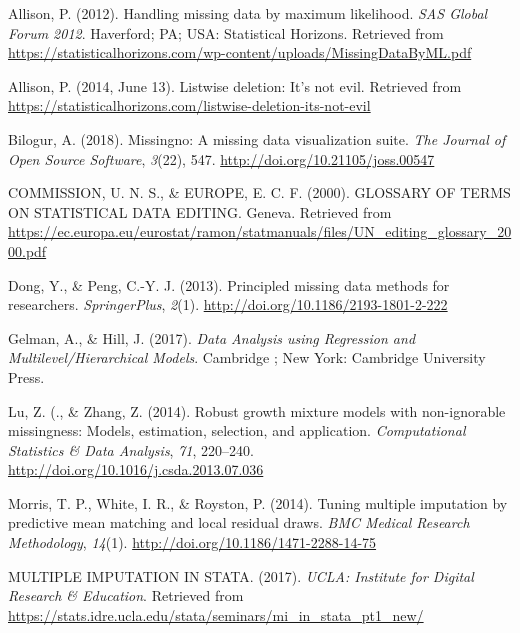 \documentclass[12pt,oneside]{chicagocapstone}
\begin{document}
\setlength{\parindent}{-0.20in} \setlength{\leftskip}{0.20in}
\setlength{\parskip}{8pt}

\hypertarget{refs}{}
\hypertarget{ref-allison_handling_2012}{}
Allison, P. (2012). Handling missing data by maximum likelihood.
\emph{SAS Global Forum 2012}. Haverford; PA; USA: Statistical Horizons.
Retrieved from
\url{https://statisticalhorizons.com/wp-content/uploads/MissingDataByML.pdf}

\hypertarget{ref-allison_handling_2014}{}
Allison, P. (2014, June 13). Listwise deletion: It's not evil. Retrieved
from
\url{https://statisticalhorizons.com/listwise-deletion-its-not-evil}

\hypertarget{ref-bilogur_missingno_2018}{}
Bilogur, A. (2018). Missingno: A missing data visualization suite.
\emph{The Journal of Open Source Software}, \emph{3}(22), 547.
\url{http://doi.org/10.21105/joss.00547}

\hypertarget{ref-econ_commission}{}
COMMISSION, U. N. S., \& EUROPE, E. C. F. (2000). GLOSSARY OF TERMS ON
STATISTICAL DATA EDITING. Geneva. Retrieved from
\url{https://ec.europa.eu/eurostat/ramon/statmanuals/files/UN_editing_glossary_2000.pdf}

\hypertarget{ref-peng_dong}{}
Dong, Y., \& Peng, C.-Y. J. (2013). Principled missing data methods for
researchers. \emph{SpringerPlus}, \emph{2}(1).
\url{http://doi.org/10.1186/2193-1801-2-222}

\hypertarget{ref-gelman_data_2017}{}
Gelman, A., \& Hill, J. (2017). \emph{Data Analysis using Regression and
Multilevel/Hierarchical Models}. Cambridge ; New York: Cambridge
University Press.

\hypertarget{ref-lu_robust_2014}{}
Lu, Z. (., \& Zhang, Z. (2014). Robust growth mixture models with
non-ignorable missingness: Models, estimation, selection, and
application. \emph{Computational Statistics \& Data Analysis},
\emph{71}, 220--240. \url{http://doi.org/10.1016/j.csda.2013.07.036}

\hypertarget{ref-morris_tuning_2014}{}
Morris, T. P., White, I. R., \& Royston, P. (2014). Tuning multiple
imputation by predictive mean matching and local residual draws.
\emph{BMC Medical Research Methodology}, \emph{14}(1).
\url{http://doi.org/10.1186/1471-2288-14-75}

\hypertarget{ref-introduction_to_sas_notitle_2017}{}
MULTIPLE IMPUTATION IN STATA. (2017). \emph{UCLA: Institute for Digital
Research \& Education}. Retrieved from
\url{https://stats.idre.ucla.edu/stata/seminars/mi_in_stata_pt1_new/}
\end{document}
